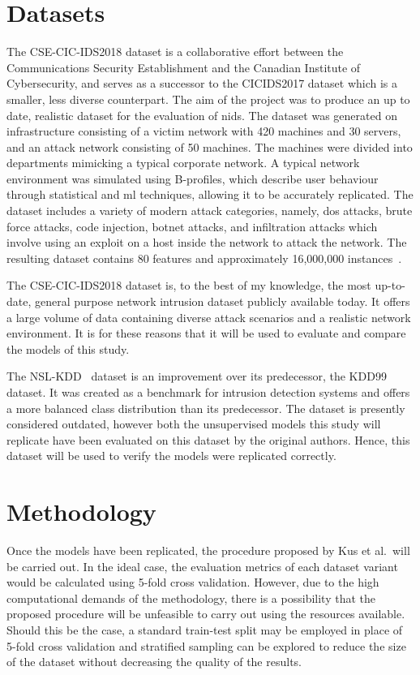 \section{Datasets}%
\label{sec:datasets}
The CSE-CIC-IDS2018 dataset is a collaborative effort between the
Communications Security Establishment and the Canadian Institute of Cybersecurity,
and serves as a successor to the CICIDS2017 dataset which is a smaller, less
diverse counterpart. The aim of the project was to produce an up to date,
realistic dataset for the evaluation of \gls{nids}. The dataset was generated
on infrastructure consisting of a victim network with 420 machines and 30
servers, and an attack network consisting of 50 machines. The machines were
divided into departments mimicking a typical corporate network. A typical
network environment was simulated using B-profiles, which describe user
behaviour through statistical and \gls{ml} techniques, allowing it to be
accurately replicated. The dataset includes a variety of modern attack
categories, namely, \gls{dos} attacks, brute force attacks, code injection,
botnet attacks, and infiltration attacks which involve using an exploit on a
host inside the network to attack the network. The resulting dataset contains
80 features and approximately 16,000,000 instances~\cite{cic2018, cic2018data}.

The CSE-CIC-IDS2018 dataset is, to the best of my knowledge, the most
up-to-date, general purpose network intrusion dataset publicly available today.
It offers a large volume of data containing diverse attack scenarios and a
realistic network environment. It is for these reasons that it will be used to
evaluate and compare the models of this study.

The NSL-KDD~\cite{nsl} dataset is an improvement over its predecessor, the
KDD99 dataset. It was created as a benchmark for intrusion detection systems
and offers a more balanced class distribution than its predecessor. The dataset
is presently considered outdated, however both the unsupervised models this
study will replicate have been evaluated on this dataset by the original
authors. Hence, this dataset will be used to verify the models were replicated
correctly.
\section{Methodology}%
\label{sec:methodology}

Once the models have been replicated, the procedure proposed by Kus et al.\
will be carried out. In the ideal case, the evaluation metrics of each dataset
variant would be calculated using 5-fold cross validation. However, due to the
high computational demands of the methodology, there is a possibility that the
proposed procedure will be unfeasible to carry out using the resources
available. Should this be the case, a standard train-test split may be employed
in place of 5-fold cross validation and stratified sampling can be explored to
reduce the size of the dataset without decreasing the quality of the results.


